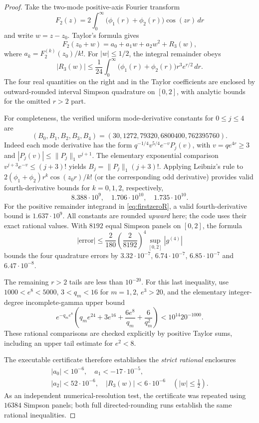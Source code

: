 \begin{proof}
Take the two-mode positive-axis Fourier
transform
\[
F_2(z)=2\int_0^\infty
\bigl(\phi_1(r)+\phi_2(r)\bigr)\cos(zr)\,dr
\]
and write $w=z-z_0$. Taylor's formula gives
\[
F_2(z_0+w)=a_0+a_1w+a_2w^2+R_3(w),
\]
where $a_k=F_2^{(k)}(z_0)/k!$.
For $|w|\le1/2$, the integral remainder
obeys
\begin{equation}
|R_3(w)|\le
\frac1{24}\int_0^\infty
\bigl(\phi_1(r)+\phi_2(r)\bigr)
r^3e^{r/2}\,dr .
\label{eq:firstzeroR}
\end{equation}
The four real quantities on the right
and in the Taylor coefficients are
enclosed by outward-rounded interval
Simpson quadrature on $[0,2]$,
with analytic bounds for the omitted
$r>2$ part.

For completeness, the verified
uniform mode-derivative constants
for $0\le j\le4$ are
\[
(B_0,B_1,B_2,B_3,B_4)=
(30,1272,79320,6800400,762395760).
\]
Indeed each mode derivative has the form
$q^{-1/4}v^{5/4}e^{-v}P_j(v)$,
with $v=qe^{4r}\ge3$ and
$|P_j(v)|\le\|P_j\|_1v^{j+1}$.
The elementary exponential comparison
$v^{j+3}e^{-v}\le(j+3)!$
yields $B_j=\|P_j\|_1(j+3)!$.
Applying Leibniz's rule to
$2(\phi_1+\phi_2)r^k\cos(z_0r)/k!$
(or the corresponding odd derivative)
provides valid fourth-derivative bounds
for $k=0,1,2$, respectively,
\[
8.388\cdot10^9,\quad
1.706\cdot10^{10},\quad
1.735\cdot10^{10}.
\]
For the positive remainder integrand
in \eqref{eq:firstzeroR}, a valid
fourth-derivative bound is
$1.637\cdot10^9$.
All constants are rounded
\emph{upward} here; the code uses
their exact rational values.
With $8192$ equal Simpson panels
on $[0,2]$, the formula
\[
|\mathrm{error}|
\le\frac2{180}
\left(\frac2{8192}\right)^4
\sup_{[0,2]}|g^{(4)}|
\]
bounds the four quadrature errors
by $3.32\cdot10^{-7}$,
$6.74\cdot10^{-7}$,
$6.85\cdot10^{-7}$ and
$6.47\cdot10^{-8}$.

The remaining $r>2$ tails
are less than $10^{-20}$.
For this last inequality, use
$1000<e^8<5000$, $3<q_m<16$
for $m=1,2$, $e^3>20$, and
the elementary integer-degree
incomplete-gamma upper bound
\[
e^{-q_me^8}
\left(q_me^{24}+3e^{16}
+\frac{6e^8}{q_m}+\frac6{q_m^2}\right)
<10^{14}20^{-1000}.
\]
These rational comparisons are
checked explicitly by positive
Taylor sums, including an upper
tail estimate for $e^2<8$.

The executable certificate therefore
establishes the \emph{strict rational}
enclosures
\begin{equation}
\boxed{
\begin{gathered}
|a_0|<10^{-6},\quad
a_1<-17\cdot10^{-5},\\
|a_2|<52\cdot10^{-6},\quad
|R_3(w)|<6\cdot10^{-6}
\quad(|w|\le\tfrac12).
\end{gathered}}
\label{eq:firstzeroTaylor}
\end{equation}
As an independent numerical-resolution
test, the certificate was repeated
using $16384$ Simpson panels; both
full directed-rounding runs establish
the same rational inequalities.


\end{proof}
